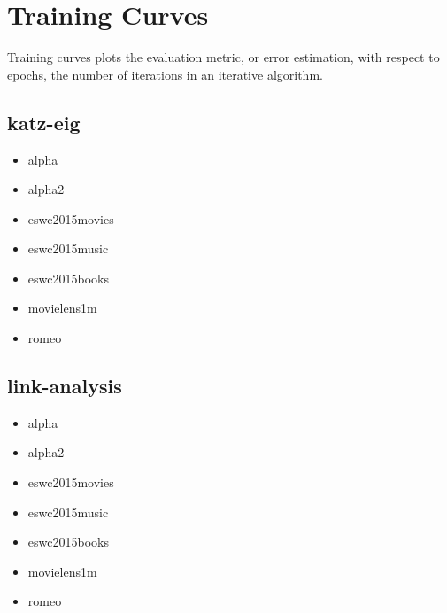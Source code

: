 
\section{Training Curves}\label{sec:graphs:training_curves}

Training curves plots the evaluation metric, or error estimation, with respect to epochs, the number of iterations in an iterative algorithm.

\subsection{katz-eig}

\begin{itemize}
    \item alpha
    \item alpha2
    \item eswc2015movies
    \item eswc2015music
    \item eswc2015books
    \item movielens1m
    \item romeo
\end{itemize}


\subsection{link-analysis}

\begin{itemize}
    \item alpha
    \item alpha2
    \item eswc2015movies
    \item eswc2015music
    \item eswc2015books
    \item movielens1m
    \item romeo
\end{itemize}


